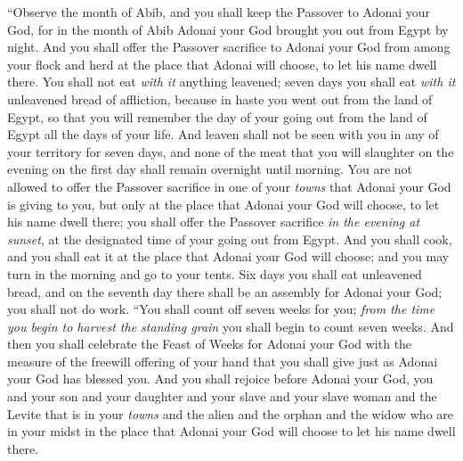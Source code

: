 \begin{biblechapter} %
\verse “Observe the month of Abib, and you shall keep the Passover to Adonai your God, for in the month of Abib Adonai your God brought you out from Egypt by night.
\verse And you shall offer the Passover sacrifice to Adonai your God from among your flock and herd at the place that Adonai will choose, to let his name dwell there.
\verse You shall not eat \textit{with it} anything leavened; seven days you shall eat \textit{with it} unleavened bread of affliction, because in haste you went out from the land of Egypt, so that you will remember the day of your going out from the land of Egypt all the days of your life.
\verse And leaven shall not be seen with you in any of your territory for seven days, and none of the meat that you will slaughter on the evening on the first day shall remain overnight until morning.
\verse You are not allowed to offer the Passover sacrifice in one of your \textit{towns} that Adonai your God is giving to you,
\verse but only at the place that Adonai your God will choose, to let his name dwell there; you shall offer the Passover sacrifice \textit{in the evening at sunset}, at the designated time of your going out from Egypt.
\verse And you shall cook, and you shall eat it at the place that Adonai your God will choose; and you may turn in the morning and go to your tents.
\verse Six days you shall eat unleavened bread, and on the seventh day there shall be an assembly for Adonai your God; you shall not do work.
\verse “You shall count off seven weeks for you; \textit{from the time you begin to harvest the standing grain} you shall begin to count seven weeks.
\verse And then you shall celebrate the Feast of Weeks for Adonai your God with the measure of the freewill offering of your hand that you shall give just as Adonai your God has blessed you.
\verse And you shall rejoice before Adonai your God, you and your son and your daughter and your slave and your slave woman and the Levite that is in your \textit{towns} and the alien and the orphan and the widow who are in your midst in the place that Adonai your God will choose to let his name dwell there.

\end{biblechapter}

